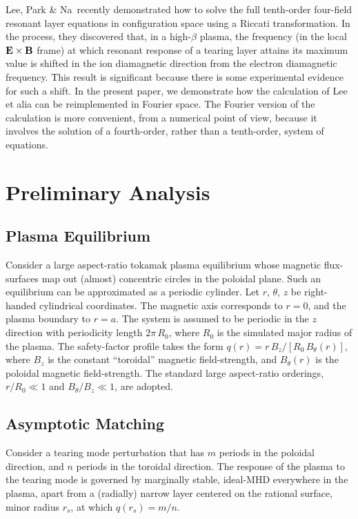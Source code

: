 \documentclass[12pt,prb,aps]{revtex4-1}
\begin{document}
 Lee, Park \& Na\,\cite{lee} recently demonstrated  how to solve the full tenth-order four-field resonant layer equations in configuration  space using a Riccati transformation. In the process, they discovered that, in a high-$\beta$ plasma,  the frequency (in the local ${\bf E}\times {\bf B}$ frame)  at which resonant response of
 a tearing layer attains its maximum value  is shifted in the ion diamagnetic direction from the electron diamagnetic frequency.
 This result is significant because there is some experimental evidence for such a shift.\cite{paz} In the present paper, we demonstrate how the calculation of
 Lee et alia can be reimplemented in Fourier space. The Fourier version of the calculation is more convenient, from a numerical point of view, because
 it involves the solution of a fourth-order, rather than a tenth-order, system of equations. 

\section{Preliminary Analysis}\label{sect1}
\subsection{Plasma Equilibrium}
Consider a large aspect-ratio tokamak plasma equilibrium whose magnetic flux-surfaces map out
(almost) concentric circles in the poloidal plane. Such an equilibrium can be approximated as a
periodic cylinder.\cite{rf1993} Let $r$, $\theta$, $z$ be right-handed cylindrical coordinates. 
The magnetic axis corresponds to $r=0$, and the plasma boundary to $r=a$. The system is assumed to be periodic in the $z$
direction with periodicity length $2\pi\,R_0$, where $R_0$ is the simulated major radius of the plasma. The
safety-factor profile takes the form $q(r)=r\,B_z/[R_0\,B_\theta(r)]$, where $B_z$ is the constant
``toroidal'' magnetic field-strength, and $B_\theta(r)$ is the poloidal magnetic field-strength. The standard
large aspect-ratio orderings, $r/R_0\ll 1$ and $B_\theta/B_z\ll 1$, are adopted. 

\subsection{Asymptotic Matching}\label{cyl}
Consider a tearing mode perturbation that has $m$ periods in the poloidal direction, and
$n$ periods in the toroidal direction. 
The response of the plasma to the tearing mode is
governed by marginally stable, ideal-MHD everywhere in the plasma, apart from a (radially) narrow
layer centered on the rational surface, minor radius $r_s$, at which $q(r_s)=m/n$.\cite{fkr}
\end{document}
